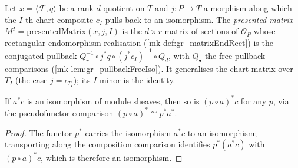 \begin{definition}\label{mk-def:gr_presentedMatrix}
  \leanok

  Let \(x = \langle \mathcal{F}, q\rangle\) be a rank-\(d\) quotient on \(T\) and \(j : P \to
  T\) a morphism along which the \(I\)-th chart composite \(c_I\) pulls back to an isomorphism.
  The \emph{presented matrix} \(M^I = \mathrm{presentedMatrix}(x, j, I)\) is the \(d\times r\)
  matrix of sections of \(\mathcal{O}_P\) whose rectangular-endomorphism realisation
  (\ref{mk-def:gr_matrixEndRect}) is the conjugated pullback
  \(Q_r^{-1}\circ j^{*}q \circ (j^{*}c_I)^{-1}\circ Q_d\), with \(Q_\bullet\) the free-pullback
  comparisons (\ref{mk-lem:gr_pullbackFreeIso}). It generalises the chart matrix over \(T_I\)
  (the case \(j = \iota_{T_I}\)); its \(I\)-minor is the identity.
\end{definition}

\begin{lemma}\label{mk-lem:gr_isIso_pullback_map_comp}
  \leanok

  If \(a^{*}c\) is an isomorphism of module sheaves, then so is \((p\circ a)^{*}c\) for any
  \(p\), via the pseudofunctor comparison \((p\circ a)^{*}\cong p^{*}a^{*}\).
\end{lemma}
\begin{proof}

  The functor \(p^{*}\) carries the isomorphism \(a^{*}c\) to an isomorphism; transporting
  along the composition comparison identifies \(p^{*}(a^{*}c)\) with \((p\circ a)^{*}c\),
  which is therefore an isomorphism.
\end{proof}

